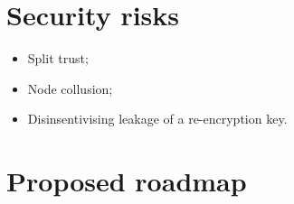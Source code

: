 \documentclass[notitlepage,longbibliography]{revtex4-1}
\begin{document}
\section{Security risks}

\begin{itemize}
    \item Split trust;
    \item Node collusion;
    \item Disinsentivising leakage of a re-encryption key.
\end{itemize}

\section{Proposed roadmap}


\end{document}
